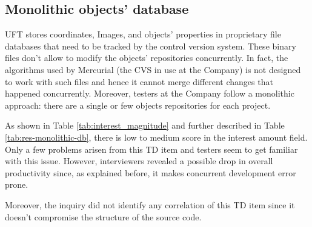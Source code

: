 	\subsection{Monolithic objects' database}

	UFT stores coordinates, Images, and objects' properties in proprietary file databases that need to be tracked by the control version system. These binary files don't allow to modify the objects' repositories concurrently. In fact, the algorithms used by Mercurial (the CVS in use at the Company) is not designed to work with such files and hence it cannot merge different changes that happened concurrently. Moreover, testers at the Company follow a monolithic approach: there are a single or few objects repositories for each project.

     \label{}
    As shown in Table \ref{tab:interest_magnitude} and further described in Table \ref{tab:res-monolithic-db}, there is low to medium score in the interest amount field. Only a few problems arisen from this TD item and testers seem to get familiar with this issue. However, interviewers revealed a possible drop in overall productivity since, as explained before, it makes concurrent development error prone.

    Moreover, the inquiry did not identify any correlation of this TD item since it doesn't compromise the structure of the source code.

